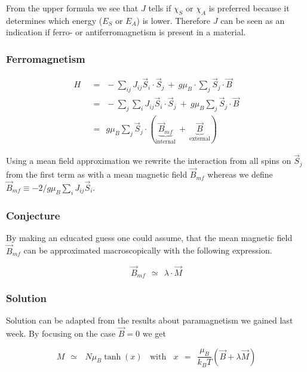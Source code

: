\documentclass[10pt]{report}
\numberwithin{equation}{chapter}
\begin{document}
From the upper formula we see that $J$ tells if $\chi_S$ or $\chi_A$ is preferred because it determines which energy ($E_S$ or $E_A$) is lower. Therefore $J$ can be seen as an indication if ferro- or antiferromagnetism is present in a material.


\subsubsection{Ferromagnetism}

\begin{align}
  H ~~& =~~ - \sum_{ij} J_{ij} \vec{S}_i \cdot \vec{S}_j ~+~ g \mu_B \cdot \sum_j \vec{S}_j \cdot \vec{B}\nonumber \\  
      & =~~ - \sum_j \sum_i J_{ij} \vec{S}_i \cdot \vec{S}_j ~+~ g \mu_B \sum_j \vec{S}_j \cdot \vec{B}\nonumber \\
      & =~~ g \mu_B \sum_j \vec{S}_j \cdot ( \underbrace{\vec{B}_{mf}}_\text{internal} ~+~ \underbrace{\vec{B}}_\text{external})
\end{align}

Using a mean field approximation we rewrite the interaction from all spins on $\vec{S}_j$ from the first term as with a mean magnetic field $\vec{B}_{mf}$ whereas we define $\vec{B}_{mf} \equiv -2/g \mu_B \sum_i J_{ij} \vec{S}_i$. 

\subsubsection{Conjecture}

By making an educated guess one could assume, that the mean magnetic field $\vec{B}_{mf}$ can be approximated macroscopically with the following expression.

\begin{equation}
  \vec{B}_{mf} ~~≃~~ \lambda \cdot \vec{M}
\end{equation}


\subsubsection{Solution}

Solution can be adapted from the results about paramagnetism we gained last week. By focusing on the case $\vec{B} = 0$ we get

\begin{equation} \label{eq:ferromag_graph_sol}
  M ~~≃~~~ N \mu_B \tanh(x) ~~~~ \text{with} ~~~~ x ~~=~~\frac{\mu_B}{k_BT} (\vec{B} + \lambda \vec{M})
\end{equation}
\end{document}
